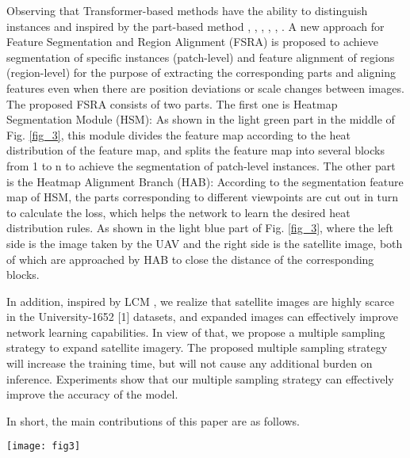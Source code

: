 \documentclass[lettersize,journal]{IEEEtran}
\begin{document}
Observing that Transformer-based methods have the ability to distinguish instances and inspired by the part-based method \cite{ref17}, \cite{ref18}, \cite{ref19}, \cite{ref20}, \cite{ref21}, \cite{ref22}. A new approach for Feature Segmentation and Region Alignment (FSRA) is proposed to achieve segmentation of specific instances (patch-level) and feature alignment of regions (region-level) for the purpose of extracting the corresponding parts and aligning features even when there are position deviations or scale changes between images. The proposed FSRA consists of two parts. The first one is Heatmap Segmentation Module (HSM): As shown in the light green part in the middle of Fig. \ref{fig_3}, this module divides the feature map according to the heat distribution of the feature map, and splits the feature map into several blocks from 1 to n to achieve the segmentation of patch-level instances. The other part is the Heatmap Alignment Branch (HAB): According to the segmentation feature map of HSM, the parts corresponding to different viewpoints are cut out in turn to calculate the loss, which helps the network to learn the desired heat distribution rules. As shown in the light blue part of Fig. \ref{fig_3}, where the left side is the image taken by the UAV and the right side is the satellite image, both of which are approached by HAB to close the distance of the corresponding blocks.

In addition, inspired by LCM \cite{ref24}, we realize that satellite images are highly scarce in the University-1652 [1] datasets, and expanded images can effectively improve network learning capabilities. In view of that, we propose a multiple sampling strategy to expand satellite imagery. The proposed multiple sampling strategy will increase the training time, but will not cause any additional burden on inference. Experiments show that our multiple sampling strategy can effectively improve the accuracy of the model. 

In short, the main contributions of this paper are as follows.


\begin{figure*}[!t]
\centering
\texttt{[image: fig3]}
\caption{The framework of proposed FSRA. The Heatmap Segmentation Module (light green) reorders the heatmap information and evenly divides it into regions according to the distribution of the heatmap to achieve the purpose of segmenting different characteristic content. Heatmap Alignment Branch (light blue) pools the features of each region to obtain feature vectors and performs classification supervision on each feature vector. In order to achieve end-to-end learning, TripletLoss is applied to each branch to narrow the distance of the same feature content. FSRA also retains the global branch (light purple) of the transformer-based strong baseline.}
\label{fig_3}
\end{figure*}
\end{document}
